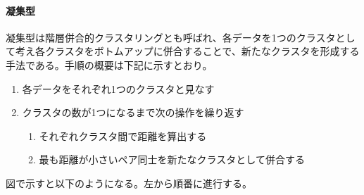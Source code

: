 \documentclass[dvipdfmx]{jsarticle}
\begin{document}
\paragraph{凝集型}
凝集型は階層併合的クラスタリングとも呼ばれ、各データを1つのクラスタとして考え各クラスタをボトムアップに併合することで、新たなクラスタを形成する手法である。手順の概要は下記に示すとおり。
\begin{enumerate}
  \item 各データをそれぞれ1つのクラスタと見なす
  \item クラスタの数が1つになるまで次の操作を繰り返す
  \begin{enumerate}
    \item それぞれクラスタ間で距離を算出する
    \item 最も距離が小さいペア同士を新たなクラスタとして併合する
  \end{enumerate}
\end{enumerate}
図で示すと以下のようになる。左から順番に進行する。
\end{document}
